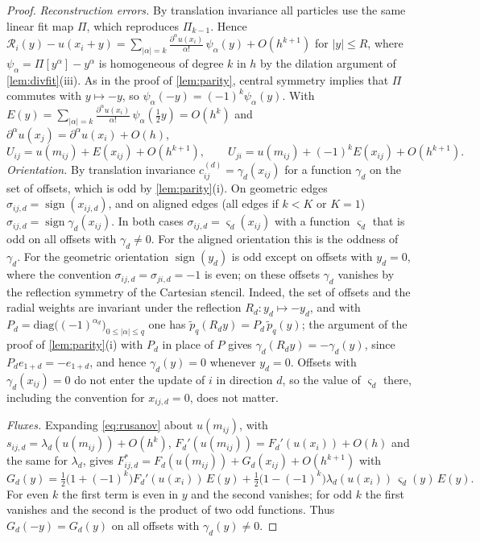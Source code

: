 \documentclass[11pt,a4paper]{article}
\theoremstyle{plain}
\theoremstyle{definition}
\theoremstyle{remark}
\numberwithin{equation}{section}
\newcommand{\Fs}{F^{*}}
\newcommand{\ptil}{\tilde p}
\newcommand{\sgn}{\operatorname{sign}}
\begin{document}
\begin{proof}
\emph{Reconstruction errors.} By translation invariance all particles use the same linear fit map $\Pi$, which reproduces $\Pi_{k-1}$. Hence $\mathcal{R}_i(y)-u(x_i+y)=\sum_{|\alpha|=k}\frac{\partial^\alpha u(x_i)}{\alpha!}\,\psi_\alpha(y)+O(h^{k+1})$ for $|y|\le R$, where $\psi_\alpha=\Pi[y^\alpha]-y^\alpha$ is homogeneous of degree $k$ in $h$ by the dilation argument of \cref{lem:divfit}(iii). As in the proof of \cref{lem:parity}, central symmetry implies that $\Pi$ commutes with $y\mapsto-y$, so $\psi_\alpha(-y)=(-1)^k\psi_\alpha(y)$. With $E(y)=\sum_{|\alpha|=k}\frac{\partial^\alpha u(x_i)}{\alpha!}\,\psi_\alpha(\tfrac12y)=O(h^k)$ and $\partial^\alpha u(x_j)=\partial^\alpha u(x_i)+O(h)$,
\[
U_{ij}=u(m_{ij})+E(x_{ij})+O(h^{k+1}),\qquad U_{ji}=u(m_{ij})+(-1)^kE(x_{ij})+O(h^{k+1}).
\]
\emph{Orientation.} By translation invariance $c^{(d)}_{ij}=\gamma_d(x_{ij})$ for a function $\gamma_d$ on the set of offsets, which is odd by \cref{lem:parity}(i). On geometric edges $\sigma_{ij,d}=\sgn(x_{ij,d})$, and on aligned edges (all edges if $k<K$ or $K=1$) $\sigma_{ij,d}=\sgn\gamma_d(x_{ij})$. In both cases $\sigma_{ij,d}=\varsigma_d(x_{ij})$ with a function $\varsigma_d$ that is odd on all offsets with $\gamma_d\ne0$. For the aligned orientation this is the oddness of $\gamma_d$. For the geometric orientation $\sgn(y_d)$ is odd except on offsets with $y_d=0$, where the convention $\sigma_{ij,d}=\sigma_{ji,d}=-1$ is even; on these offsets $\gamma_d$ vanishes by the reflection symmetry of the Cartesian stencil. Indeed, the set of offsets and the radial weights are invariant under the reflection $R_d\colon y_d\mapsto-y_d$, and with $P_d=\mathrm{diag}\big((-1)^{\alpha_d}\big)_{0\le|\alpha|\le q}$ one has $\ptil_q(R_dy)=P_d\,\ptil_q(y)$; the argument of the proof of \cref{lem:parity}(i) with $P_d$ in place of $P$ gives $\gamma_d(R_dy)=-\gamma_d(y)$, since $P_de_{1+d}=-e_{1+d}$, and hence $\gamma_d(y)=0$ whenever $y_d=0$. Offsets with $\gamma_d(x_{ij})=0$ do not enter the update of $i$ in direction $d$, so the value of $\varsigma_d$ there, including the convention for $x_{ij,d}=0$, does not matter.

\emph{Fluxes.} Expanding \eqref{eq:rusanov} about $u(m_{ij})$, with $s_{ij,d}=\lambda_d(u(m_{ij}))+O(h^k)$, $F_d'(u(m_{ij}))=F_d'(u(x_i))+O(h)$ and the same for $\lambda_d$, gives $\Fs_{ij,d}=F_d(u(m_{ij}))+G_d(x_{ij})+O(h^{k+1})$ with
\[
G_d(y)=\tfrac12\big(1+(-1)^k\big)F_d'(u(x_i))\,E(y)+\tfrac12\big(1-(-1)^k\big)\lambda_d(u(x_i))\,\varsigma_d(y)\,E(y).
\]
For even $k$ the first term is even in $y$ and the second vanishes; for odd $k$ the first vanishes and the second is the product of two odd functions. Thus $G_d(-y)=G_d(y)$ on all offsets with $\gamma_d(y)\ne0$.


\end{proof}
\end{document}
